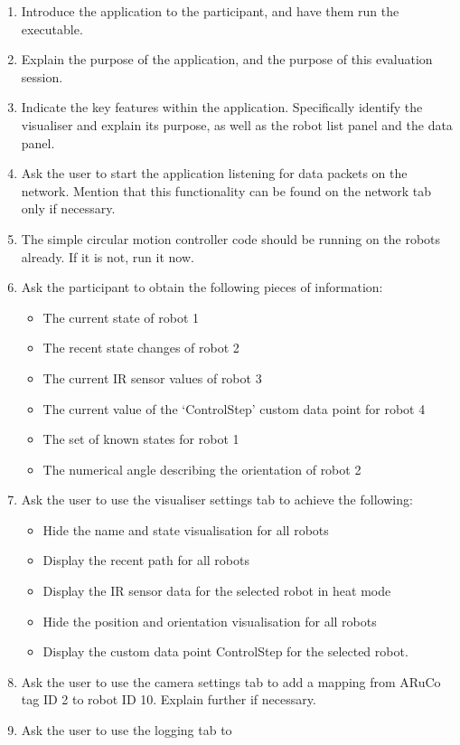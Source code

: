 \begin{enumerate}
 \item Introduce the application to the participant, and have them run the executable.
 \item Explain the purpose of the application, and the purpose of this evaluation session.
 \item Indicate the key features within the application. Specifically identify the visualiser and explain its purpose, as well as the robot list panel and the data panel.
 \item Ask the user to start the application listening for data packets on the network. Mention that this functionality can be found on the network tab only if necessary.
 \item The simple circular motion controller code should be running on the robots already. If it is not, run it now.
 \item Ask the participant to obtain the following pieces of information:
 \begin{itemize}
  \item The current state of robot 1
  \item The recent state changes of robot 2
  \item The current IR sensor values of robot 3
  \item The current value of the `ControlStep' custom data point for robot 4
  \item The set of known states for robot 1
  \item The numerical angle describing the orientation of robot 2
 \end{itemize}
 \item Ask the user to use the visualiser settings tab to achieve the following:
 \begin{itemize}
  \item Hide the name and state visualisation for all robots
  \item Display the recent path for all robots
  \item Display the IR sensor data for the selected robot in heat mode
  \item Hide the position and orientation visualisation for all robots
  \item Display the custom data point ControlStep for the selected robot.
 \end{itemize}
 \item Ask the user to use the camera settings tab to add a mapping from ARuCo tag ID 2 to robot ID 10. Explain further if necessary.
 \item Ask the user to use the logging tab to 
\end{enumerate}


